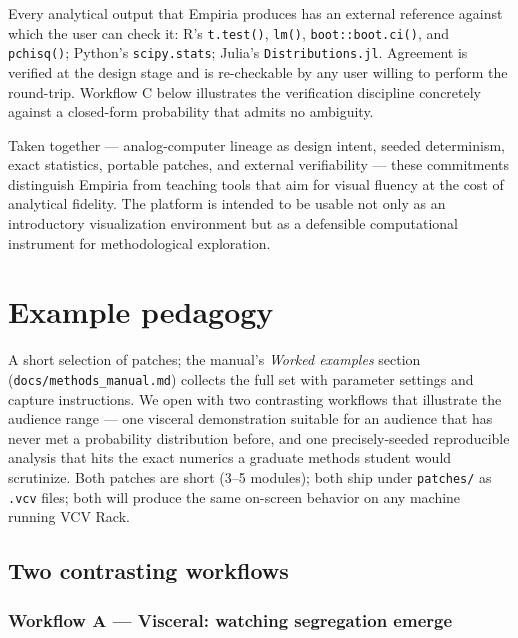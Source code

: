 Every analytical output that Empiria produces has an external reference
against which the user can check it: R's \texttt{t.test()},
\texttt{lm()}, \texttt{boot::boot.ci()}, and \texttt{pchisq()}; Python's
\texttt{scipy.stats}; Julia's \texttt{Distributions.jl}. Agreement is
verified at the design stage and is re-checkable by any user willing to
perform the round-trip. Workflow C below illustrates the verification
discipline concretely against a closed-form probability that admits no
ambiguity.

Taken together --- analog-computer lineage as design intent, seeded
determinism, exact statistics, portable patches, and external
verifiability --- these commitments distinguish Empiria from teaching
tools that aim for visual fluency at the cost of analytical fidelity.
The platform is intended to be usable not only as an introductory
visualization environment but as a defensible computational instrument
for methodological exploration.

\section{Example pedagogy}\label{example-pedagogy}

A short selection of patches; the manual's \emph{Worked examples}
section (\texttt{docs/methods\_manual.md}) collects the full set with
parameter settings and capture instructions. We open with two
contrasting workflows that illustrate the audience range --- one
visceral demonstration suitable for an audience that has never met a
probability distribution before, and one precisely-seeded reproducible
analysis that hits the exact numerics a graduate methods student would
scrutinize. Both patches are short (3--5 modules); both ship under
\texttt{patches/} as \texttt{.vcv} files; both will produce the same
on-screen behavior on any machine running VCV Rack.

\subsection{Two contrasting workflows}\label{two-contrasting-workflows}

\subsubsection{Workflow A --- Visceral: watching segregation
emerge}\label{workflow-a-visceral-watching-segregation-emerge}

